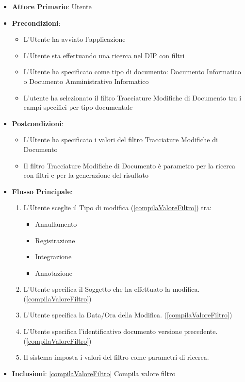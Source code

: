 \begin{itemize}
      \item \textbf{Attore Primario}: Utente
      \item \textbf{Precondizioni}: 
      \begin{itemize}
            \item L'Utente ha avviato l'applicazione
            \item L'Utente sta effettuando una ricerca nel DIP con filtri
            \item L'Utente ha specificato come tipo di documento: Documento Informatico o Documento Amministrativo Informatico
            \item L'utente ha selezionato il filtro Tracciature Modifiche di Documento tra i campi specifici per tipo documentale
      \end{itemize}
      \item \textbf{Postcondizioni}: \begin{itemize}
            \item L'Utente ha specificato i valori del filtro Tracciature Modifiche di Documento
            \item Il filtro Tracciature Modifiche di Documento è parametro per la ricerca con filtri e per la generazione del risultato
      \end{itemize}
      \item \textbf{Flusso Principale}:
            \begin{enumerate}
                  \item L'Utente sceglie il Tipo di modifica (\ref{compilaValoreFiltro}) tra:
                        \begin{itemize}
                              \item Annullamento
                              \item Registrazione
                              \item Integrazione
                              \item Annotazione
                        \end{itemize}
                  \item L'Utente specifica il Soggetto che ha effettuato la modifica. (\ref{compilaValoreFiltro})
                  \item L'Utente specifica la Data/Ora della Modifica. (\ref{compilaValoreFiltro})
                  \item L'Utente specifica l'identificativo documento versione precedente. (\ref{compilaValoreFiltro})
                  \item Il sistema imposta i valori del filtro come parametri di ricerca.
            \end{enumerate}
      \item \textbf{Inclusioni}: \ref{compilaValoreFiltro} Compila valore filtro
\end{itemize}

